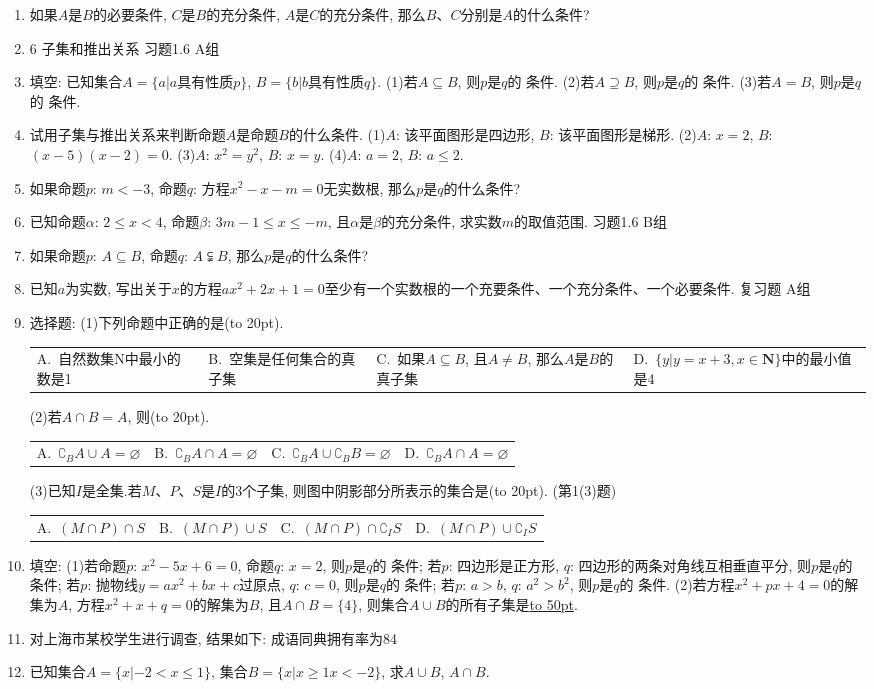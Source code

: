 \documentclass[10pt,a4paper]{article}
\newcommand{\blank}[1]{\underline{\hbox to #1pt{}}}
\newcommand{\bracket}[1]{(\hbox to #1pt{})}
\newcommand{\fourch}[4]{\par\begin{tabular}{p{.23\textwidth}p{.23\textwidth}p{.23\textwidth}p{.23\textwidth}}
A.~#1 &B.~#2& C.~#3& D.~#4
\end{tabular}}
\begin{document}
\begin{enumerate}[1.]
\item 如果$A$是$B$的必要条件, $C$是$B$的充分条件, $A$是$C$的充分条件, 那么$B$、$C$分别是$A$的什么条件?
\item 6  子集和推出关系
习题1.6  A组
\item 填空:
已知集合$A=\{a|a$具有性质$p\}$, $B=\{b|b$具有性质$q\}$.
(1)若$A\subseteq B$, 则$p$是$q$的  条件.
(2)若$A\supseteq B$, 则$p$是$q$的  条件.
(3)若$A=B$, 则$p$是$q$的  条件.
\item 试用子集与推出关系来判断命题$A$是命题$B$的什么条件.
(1)$A$: 该平面图形是四边形, 		$B$: 该平面图形是梯形.
(2)$A$: $x=2$, 					$B$: $(x-5)(x-2)=0$.
(3)$A$: $x^2=y^2$, 					$B$: $x=y$.
(4)$A$: $a=2$, 					$B$: $a\le 2$.
\item 如果命题$p$: $m<-3$, 命题$q$: 方程$x^2-x-m=0$无实数根, 那么$p$是$q$的什么条件?
\item 已知命题$\alpha$: $2\le x<4$, 命题$\beta$: $3m-1\le x\le -m$, 且$\alpha$是$\beta$的充分条件, 求实数$m$的取值范围.
习题1.6  B组
\item 如果命题$p$: $A\subseteq B$, 命题$q$: $A\subsetneqq B$, 那么$p$是$q$的什么条件?
\item 已知$a$为实数, 写出关于$x$的方程$ax^2+2x+1=0$至少有一个实数根的一个充要条件、一个充分条件、一个必要条件.
复习题
A组
\item 选择题:
(1)下列命题中正确的是\bracket{20}.
\fourch{自然数集N中最小的数是1}{空集是任何集合的真子集}{如果$A\subseteq B$, 且$A\ne B$, 那么$A$是$B$的真子集}{$\{y|y=x+3,x\in \mathbf{N}\}$中的最小值是4}
(2)若$A\cap B=A$, 则\bracket{20}.
\fourch{$\complement _BA\cup A=\varnothing$}{$\complement _BA\cap A=\varnothing$}{$\complement _BA\cup \complement _BB=\varnothing$}{$\complement _BA\cap A=\varnothing$}
(3)已知$I$是全集.若$M$、$P$、$S$是$I$的3个子集, 则图中阴影部分所表示的集合是\bracket{20}.
(第1(3)题)
\fourch{$(M\cap P)\cap S$}{$(M\cap P)\cup S$}{$(M\cap P)\cap \complement _IS$}{$(M\cap P)\cup \complement _IS$}
\item 填空:
(1)若命题$p$: $x^2-5x+6=0$, 命题$q$: $x=2$, 则$p$是$q$的 条件;
若$p$: 四边形是正方形, $q$: 四边形的两条对角线互相垂直平分, 则$p$是$q$的    条件;
若$p$: 抛物线$y=ax^2+bx+c$过原点, $q$: $c=0$, 则$p$是$q$的    条件;
若$p$: $a>b$, $q$: $a^2>b^2$, 则$p$是$q$的    条件.
(2)若方程$x^2+px+4=0$的解集为$A$, 方程$x^2+x+q=0$的解集为$B$, 且$A\cap B=\{4\}$, 则集合$A\cup B$的所有子集是\blank{50}.
\item 对上海市某校学生进行调查, 结果如下: 成语同典拥有率为84%
\item 已知集合$A=\{x|-2<x\le 1\}$, 集合$B=\{x|x\ge 1x<-2\}$, 求$A\cup B$, $A\cap B$.

\end{enumerate}
\end{document}
